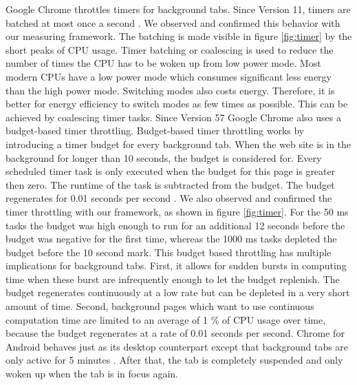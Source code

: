 \documentclass[
	ruledheaders=section,%
	class=report,%
	thesis={type=bachelor},%
	accentcolor=9c,%
	custommargins=true,%
	marginpar=false,%
	parskip=half-,%
	fontsize=11pt,%
]{tudapub}
\begin{document}
  Google Chrome throttles timers for background tabs. Since Version 11, timers are batched at most once a second \cite{chrome-background-tabs}. We observed and confirmed this behavior with our measuring framework. The batching is made visible in figure \ref{fig:timer} by the short peaks of CPU usage. Timer batching or coalescing is used to reduce the number of times the CPU has to be woken up from low power mode. Most modern CPUs have a low power mode which consumes significant less energy than the high power mode. Switching modes also costs energy. Therefore, it is better for energy efficiency to switch modes as few times as possible. This can be achieved by coalescing timer tasks. Since Version 57 Google Chrome also uses a budget-based timer throttling. Budget-based timer throttling works by introducing a timer budget for every background tab. When the web site is in the background for longer than 10 seconds, the budget is considered for. Every scheduled timer task is only executed when the budget for this page is greater then zero. The runtime of the task is subtracted from the budget. The budget regenerates for 0.01 seconds per second \cite{chrome-background-tabs}. We also observed and confirmed the timer throttling with our framework, as shown in figure \ref{fig:timer}. For the 50 ms tasks the budget was high enough to run for an additional 12 seconds before the budget was negative for the first time, whereas the 1000 ms tasks depleted the budget before the 10 second mark. This budget based throttling has multiple implications for background tabs. First, it allows for sudden bursts in computing time when these burst are infrequently enough to let the budget replenish. The budget regenerates continuously at a low rate but can be depleted in a very short amount of time. Second, background pages which want to use continuous computation time are limited to an average of 1 \% of CPU usage over time, because the budget regenerates at a rate of 0.01 seconds per second. Chrome for Android behaves just as its desktop counterpart except that background tabs are only active for 5 minutes \cite{chrome-android-suspend}. After that, the tab is completely suspended and only woken up when the tab is in focus again.
\end{document}
